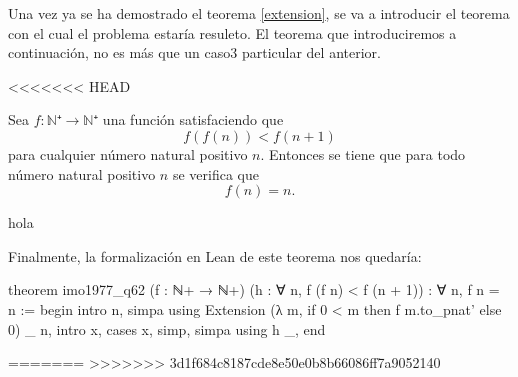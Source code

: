 Una vez ya se ha demostrado el teorema \ref{extension}, se va a
introducir el teorema con el cual el problema estaría resuleto.
El teorema que introduciremos a continuación, no es más que un caso3
particular del anterior.

<<<<<<< HEAD
\begin{teorema}[imo1977\(\_ \)q62]
  Sea \(f:ℕ⁺ → ℕ⁺\) una función satisfaciendo que
  \begin{equation}
    f(f(n))<f(n+1)
  \end{equation}
  para cualquier número natural positivo \(n\). Entonces se tiene
  que para todo número natural positivo \(n\) se verifica que
  \begin{equation}
    f(n)=n.
  \end{equation}
\end{teorema}
\begin{demostracion}
hola
\end{demostracion}

Finalmente, la formalización en Lean de este teorema nos quedaría:
\begin{leancode}
theorem imo1977_q62 (f : ℕ+ → ℕ+) (h : ∀ n, f (f n) < f (n + 1)) :
  ∀ n, f n = n :=
begin
  intro n,
  simpa using Extension (λ m, if 0 < m then f m.to_pnat' else 0) _ n,
  intro x,
  cases x,
  {simp},
  {simpa using h _},
end
\end{leancode}

=======
>>>>>>> 3d1f684c8187cde8e50e0b8b66086ff7a9052140

